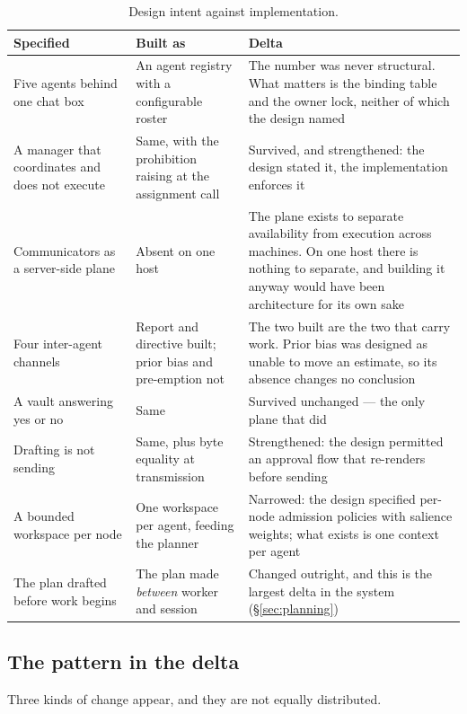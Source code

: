\documentclass[11pt]{article}
\begin{document}
\begin{table}[h]
\centering\small
\caption{Design intent against implementation.}
\label{tab:vsdesign}
\begin{tabular}{@{}L{4.0cm}L{4.4cm}L{5.0cm}@{}}
\toprule
\textbf{Specified} & \textbf{Built as} & \textbf{Delta} \\
\midrule
Five agents behind one chat box & An agent registry with a configurable roster & The number was never structural. What matters is the binding table and the owner lock, neither of which the design named \\
A manager that coordinates and does not execute & Same, with the prohibition raising at the assignment call & Survived, and strengthened: the design stated it, the implementation enforces it \\
Communicators as a server-side plane & Absent on one host & The plane exists to separate availability from execution across machines. On one host there is nothing to separate, and building it anyway would have been architecture for its own sake \\
Four inter-agent channels & Report and directive built; prior bias and pre-emption not & The two built are the two that carry work. Prior bias was designed as unable to move an estimate, so its absence changes no conclusion \\
A vault answering yes or no & Same & Survived unchanged --- the only plane that did \\
Drafting is not sending & Same, plus byte equality at transmission & Strengthened: the design permitted an approval flow that re-renders before sending \\
A bounded workspace per node & One workspace per agent, feeding the planner & Narrowed: the design specified per-node admission policies with salience weights; what exists is one context per agent \\
The plan drafted before work begins & The plan made \emph{between} worker and session & Changed outright, and this is the largest delta in the system (\S\ref{sec:planning}) \\
\bottomrule
\end{tabular}
\end{table}

\subsection{The pattern in the delta}

Three kinds of change appear, and they are not equally distributed.
\end{document}
